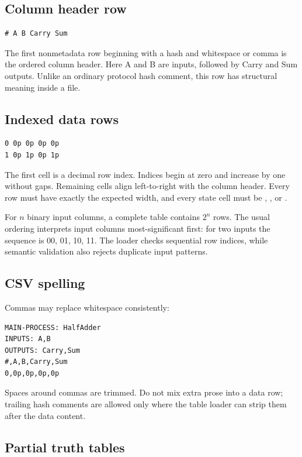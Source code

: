 \subsection{Column header row}

\begin{lstlisting}
# A B Carry Sum
\end{lstlisting}
The first nonmetadata row beginning with a hash and whitespace or comma is the
ordered column header. Here A and B are inputs, followed by Carry and Sum
outputs. Unlike an ordinary protocol hash comment, this row has structural
meaning inside a  file.

\subsection{Indexed data rows}

\begin{lstlisting}
0 0p 0p 0p 0p
1 0p 1p 0p 1p
\end{lstlisting}
The first cell is a decimal row index. Indices begin at zero and increase by
one without gaps. Remaining cells align left-to-right with the column header.
Every row must have exactly the expected width, and every state cell must be
, , or .

For $n$ binary input columns, a complete table contains $2^n$ rows. The usual
ordering interprets input columns most-significant first: for two inputs the
sequence is 00, 01, 10, 11. The loader checks sequential row indices, while
semantic validation also rejects duplicate input patterns.

\subsection{CSV spelling}

Commas may replace whitespace consistently:
\begin{lstlisting}
MAIN-PROCESS: HalfAdder
INPUTS: A,B
OUTPUTS: Carry,Sum
#,A,B,Carry,Sum
0,0p,0p,0p,0p
\end{lstlisting}
Spaces around commas are trimmed. Do not mix extra prose into a data row;
trailing hash comments are allowed only where the table loader can strip them
after the data content.

\subsection{Partial truth tables}

